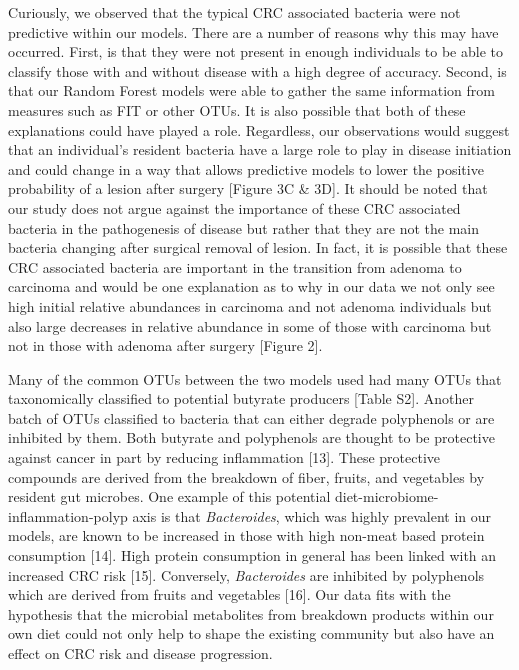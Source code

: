 \documentclass[12pt,]{article}
\begin{document}
Curiously, we observed that the typical CRC associated bacteria were not
predictive within our models. There are a number of reasons why this may
have occurred. First, is that they were not present in enough
individuals to be able to classify those with and without disease with a
high degree of accuracy. Second, is that our Random Forest models were
able to gather the same information from measures such as FIT or other
OTUs. It is also possible that both of these explanations could have
played a role. Regardless, our observations would suggest that an
individual's resident bacteria have a large role to play in disease
initiation and could change in a way that allows predictive models to
lower the positive probability of a lesion after surgery {[}Figure 3C \&
3D{]}. It should be noted that our study does not argue against the
importance of these CRC associated bacteria in the pathogenesis of
disease but rather that they are not the main bacteria changing after
surgical removal of lesion. In fact, it is possible that these CRC
associated bacteria are important in the transition from adenoma to
carcinoma and would be one explanation as to why in our data we not only
see high initial relative abundances in carcinoma and not adenoma
individuals but also large decreases in relative abundance in some of
those with carcinoma but not in those with adenoma after surgery
{[}Figure 2{]}.

Many of the common OTUs between the two models used had many OTUs that
taxonomically classified to potential butyrate producers {[}Table S2{]}.
Another batch of OTUs classified to bacteria that can either degrade
polyphenols or are inhibited by them. Both butyrate and polyphenols are
thought to be protective against cancer in part by reducing inflammation
{[}13{]}. These protective compounds are derived from the breakdown of
fiber, fruits, and vegetables by resident gut microbes. One example of
this potential diet-microbiome-inflammation-polyp axis is that
\emph{Bacteroides}, which was highly prevalent in our models, are known
to be increased in those with high non-meat based protein consumption
{[}14{]}. High protein consumption in general has been linked with an
increased CRC risk {[}15{]}. Conversely, \emph{Bacteroides} are
inhibited by polyphenols which are derived from fruits and vegetables
{[}16{]}. Our data fits with the hypothesis that the microbial
metabolites from breakdown products within our own diet could not only
help to shape the existing community but also have an effect on CRC risk
and disease progression.
\end{document}
